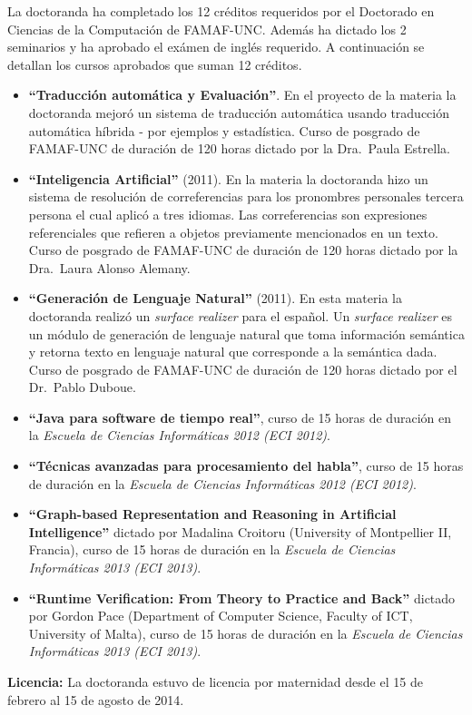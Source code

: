La doctoranda ha completado los 12 cr\'editos requeridos por el Doctorado en Ciencias de la Computaci\'on de FAMAF-UNC. Adem\'as ha dictado los 2 seminarios y ha aprobado el ex\'amen de ingl\'es requerido. A continuaci\'on se detallan los cursos aprobados que suman 12 cr\'editos.  

\begin{itemize}
\item {\bf ``Traducci\'on autom\'atica y Evaluaci\'on''}. En el proyecto de la materia la doctoranda mejor\'o un sistema de traducci\'on autom\'atica  usando traducci\'on autom\'atica h\'ibrida - por ejemplos y estad\'istica. Curso de posgrado de FAMAF-UNC de duraci\'on de 120 horas dictado por la Dra.~Paula Estrella. 
\item {\bf ``Inteligencia Artificial''} (2011). En la materia la doctoranda hizo un sistema de resoluci\'on de correferencias para los pronombres personales tercera persona el cual aplic\'o a tres idiomas. Las correferencias son expresiones referenciales que refieren a objetos previamente mencionados en un texto. Curso de posgrado de FAMAF-UNC de duraci\'on de 120 horas dictado por la Dra.~Laura Alonso Alemany. 
\item {\bf ``Generaci\'on de Lenguaje Natural''} (2011). En esta materia la doctoranda realiz\'o un {\it surface realizer} para el espa\~{n}ol. Un {\it surface realizer} es un m\'odulo de generaci\'on de lenguaje natural que toma informaci\'on sem\'antica y retorna texto en lenguaje natural que corresponde a la sem\'antica dada. Curso de posgrado de FAMAF-UNC de duraci\'on de 120 horas dictado por el Dr.~Pablo Duboue. 
\item \textbf{``Java para software de tiempo real''}, curso de 15 horas de duraci\'on en la \emph{Escuela de Ciencias Inform\'aticas 2012 (ECI 2012)}.
\item \textbf{``T\'ecnicas avanzadas para procesamiento del habla''}, curso de 15 horas de duraci\'on en la \emph{Escuela de Ciencias Inform\'aticas 2012 (ECI 2012)}.
\item \textbf{``Graph-based Representation and Reasoning in Artificial Intelligence''} dictado por Madalina Croitoru (University of Montpellier II, Francia), curso de 15 horas de duraci\'on en la \emph{Escuela de Ciencias Inform\'aticas 2013 (ECI 2013)}.
\item \textbf{``Runtime Verification: From Theory to Practice and Back''} dictado por Gordon Pace (Department  of  Computer  Science,  Faculty  of  ICT,  University  of  Malta), curso de 15 horas de duraci\'on en la \emph{Escuela de Ciencias Inform\'aticas 2013 (ECI 2013)}.
\end{itemize}

\textbf{Licencia:}
La doctoranda estuvo de licencia por maternidad desde el 15 de febrero al 15 de agosto de 2014. 




